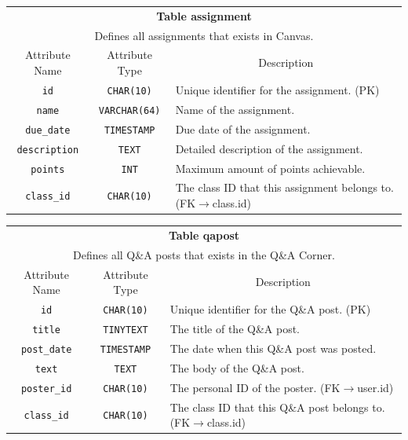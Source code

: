 \documentclass{paper}
\begin{document}
\begin{center}
		\begin{tabular}{c | c | l}
			\toprule
			\multicolumn{3}{c}{\textbf{Table assignment}} \\
			\multicolumn{3}{c}{Defines all assignments that exists in Canvas.}\\
			\midrule
			Attribute Name & Attribute Type & \multicolumn{1}{c}{Description} \\
			\verb|id| & \verb|CHAR(10)| & Unique identifier for the assignment. (PK)\\
			\verb|name| & \verb|VARCHAR(64)| & Name of the assignment.\\
			\verb|due_date| & \verb|TIMESTAMP| & Due date of the assignment.\\
			\verb|description| & \verb|TEXT| & Detailed description of the assignment.\\
			\verb|points| & \verb|INT| & Maximum amount of points achievable.\\
			\verb|class_id| & \verb|CHAR(10)| & The class ID that this assignment belongs to. (FK$\to$class.id)\\
			\bottomrule
		\end{tabular}\vspace{1.5em}
		
		\begin{tabular}{c | c | l}
			\toprule
			\multicolumn{3}{c}{\textbf{Table qapost}} \\
			\multicolumn{3}{c}{Defines all Q\&A posts that exists in the Q\&A Corner.}\\
			\midrule
			Attribute Name & Attribute Type & \multicolumn{1}{c}{Description} \\
			\verb|id| & \verb|CHAR(10)| & Unique identifier for the Q\&A post. (PK)\\
			\verb|title| & \verb|TINYTEXT| & The title of the Q\&A post. \\
			\verb|post_date| & \verb|TIMESTAMP| & The date when this Q\&A post was posted. \\
			\verb|text| & \verb|TEXT| & The body of the Q\&A post. \\
			\verb|poster_id| & \verb|CHAR(10)| & The personal ID of the poster. (FK$\to$user.id) \\
			\verb|class_id| & \verb|CHAR(10)| & The class ID that this Q\&A post belongs to. (FK$\to$class.id) \\
			\bottomrule
		\end{tabular}\vspace{1.5em}
			

\end{center}
\end{document}
